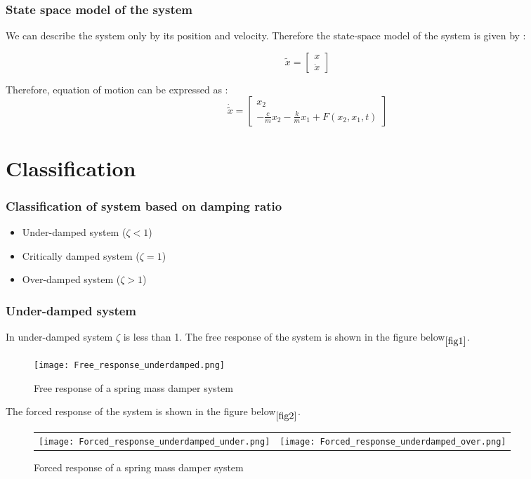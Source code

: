 \documentclass[10pt]{beamer}
\begin{document}
\begin{frame}
\frametitle{State space model of the system}
We can describe the system only by its position and velocity. Therefore the state-space model
of the system is given by :

\[
\widetilde{x}=
\begin{bmatrix}
x \\
\dot{x}
\end{bmatrix}
\]

Therefore, equation of motion can be expressed as :
\[
\dot{\widetilde{x}}=
\begin{bmatrix}
x_2\\
- \frac{c}{m}x_2 - \frac{k}{m}x_1 + F(x_2,x_1,t)
\end{bmatrix}
\]

\end{frame}

\section{Classification}

\begin{frame}
\frametitle{Classification of system based on damping ratio}
\begin{itemize}
	\item{Under-damped system ($\zeta < 1$)}
	\item{Critically damped system ($\zeta = 1$)}
	\item{Over-damped system ($\zeta > 1$)}
\end{itemize}
\end{frame}

\begin{frame}
\frametitle{Under-damped system}
In under-damped system $\zeta$ is less than 1.
The free response of the system is shown in the figure below$\phantom{}_{\ref{fig1}}$.

\begin{figure}[h]
	\centering
	\texttt{[image: Free\_response\_underdamped.png]}
	\caption{Free response of a spring mass damper system}
\end{figure}
\label{fig1}

\end{frame}


\begin{frame}
The forced response of the system is shown in the figure below$\phantom{}_{\ref{fig2}}$.

\begin{figure}[h]
	\begin{tabular} {l c}
	\texttt{[image: Forced\_response\_underdamped\_under.png]} &
	\texttt{[image: Forced\_response\_underdamped\_over.png]} 
	\end{tabular}
	\caption{Forced response of a spring mass damper system}
\end{figure}
\label{fig2}

\end{frame}
 
\end{document}
